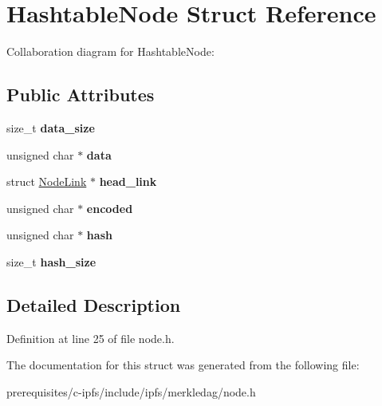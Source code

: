 \hypertarget{struct_hashtable_node}{}\section{Hashtable\+Node Struct Reference}
\label{struct_hashtable_node}


Collaboration diagram for Hashtable\+Node\+:
\subsection*{Public Attributes}
\begin{DoxyCompactItemize}
\item 
\mbox{\label{struct_hashtable_node_a434e2685aa79cf6d20d3dcb24daba944}} 
size\+\_\+t {\bfseries data\+\_\+size}
\item 
\mbox{\label{struct_hashtable_node_a941823f915952c8544d1f4000ff7f5a9}} 
unsigned char $\ast$ {\bfseries data}
\item 
\mbox{\label{struct_hashtable_node_a59e066de826a04d82b8f31d89aade8dc}} 
struct \mbox{\hyperlink{struct_node_link}{Node\+Link}} $\ast$ {\bfseries head\+\_\+link}
\item 
\mbox{\label{struct_hashtable_node_a1afdd01a42d8e03933b7dc834e2e4e47}} 
unsigned char $\ast$ {\bfseries encoded}
\item 
\mbox{\label{struct_hashtable_node_a86440188e8e7791366e6283603cf53bd}} 
unsigned char $\ast$ {\bfseries hash}
\item 
\mbox{\label{struct_hashtable_node_a710ded20057d84a07e7c4d145c36fc1d}} 
size\+\_\+t {\bfseries hash\+\_\+size}
\end{DoxyCompactItemize}


\subsection{Detailed Description}


Definition at line 25 of file node.\+h.



The documentation for this struct was generated from the following file\+:\begin{DoxyCompactItemize}
\item 
prerequisites/c-\/ipfs/include/ipfs/merkledag/node.\+h\end{DoxyCompactItemize}
